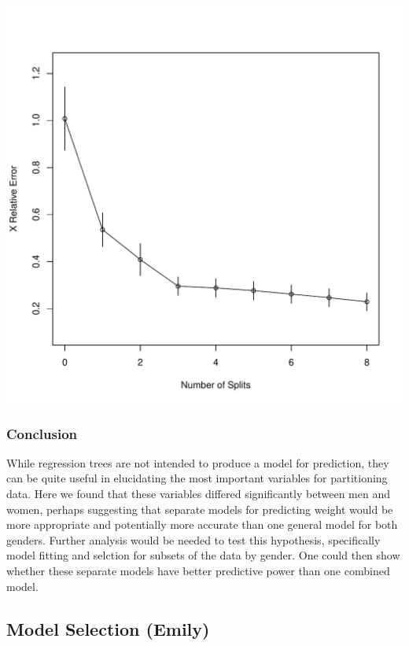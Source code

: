 \documentclass[11pt]{article}\usepackage[]{graphicx}\usepackage[]{color}
\makeatletter
\def\maxwidth{ %
  \ifdim\Gin@nat@width>\linewidth
    \linewidth
  \else
    \Gin@nat@width
  \fi
}
\newenvironment{knitrout}{}{} %
\makeatother
\begin{document}
\begin{knitrout}
\includegraphics[width=\maxwidth]{figure/rsqf2} 

\end{knitrout}


\subsubsection{Conclusion}
While regression trees are not intended to produce a model for prediction, they can be quite useful in elucidating the most important variables for partitioning data. Here we found that these variables differed significantly between men and women, perhaps suggesting that separate models for predicting weight would be more appropriate and potentially more accurate than one general model for both genders. Further analysis would be needed to test this hypothesis, specifically model fitting and selction for subsets of the data by gender. One could then show whether these separate models have better predictive power than one combined model.
\pagebreak


\subsection{Model Selection (Emily)} %
\end{document}
